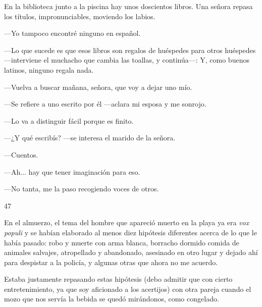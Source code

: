 \documentclass[12pt,twoside,openright,a5paper]{book}
\begin{document}
\nopagebreak

\vspace{0.5cm}

\nopagebreak

En la biblioteca junto a la piscina hay unos doscientos libros.  Una señora
repasa los títulos, impronunciables, moviendo los labios.

---Yo tampoco encontré ninguno en español.

---Lo que sucede es que esos libros son regalos de huéspedes para otros huéspedes
---interviene el muchacho que cambia las toallas, y continúa---: Y, como buenos latinos, ninguno
regala nada.

---Vuelva a buscar mañana, señora, que voy a dejar uno mío.

---Se refiere a uno escrito por él ---aclara mi esposa y me sonrojo.

---Lo va a distinguir fácil porque es finito.

---¿Y qué escribís? ---se interesa el marido de la señora.

---Cuentos.

---Ah... hay que tener imaginación para eso.

---No tanta, me la paso recogiendo voces de otros.

\vspace{0.5cm}

\hrulefill \hspace{0.1cm}\decofourleft\hspace{0.2cm} 47 \hspace{0.2cm}\decofourright \hspace{0.1cm}\hrulefill

\nopagebreak

\vspace{0.5cm}

\nopagebreak

En el almuerzo, el tema del hombre que apareció muerto en la playa ya era
\emph{vox populi} y se habían elaborado al menos diez hipótesis diferentes
acerca de lo que le había pasado: robo y muerte con arma blanca, borracho
dormido comida de animales salvajes, atropellado y abandonado, asesinado
en otro lugar y dejado ahí para despistar a la policía, y algunas otras
que ahora no me acuerdo.

Estaba justamente repasando estas hipótesis (debo admitir que con cierto
entretenimiento, ya que soy aficionado a los acertijos) con otra
pareja cuando el mozo que nos servía la bebida se quedó mirándonos,
como congelado. 
\end{document}
